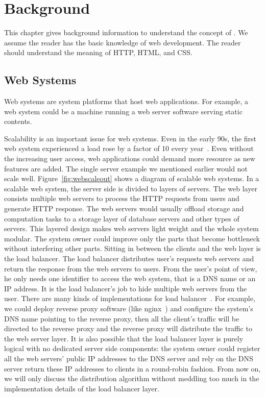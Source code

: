 \chapter{Background}

This chapter gives background information to understand the concept of \cbtwo.
We assume the reader has the basic knowledge of web development.
The reader should understand the meaning of HTTP, HTML, \js and CSS.

\webscaleoutfig{}

\section{Web Systems}

Web systems are system platforms that host web applications.
For example, a web system could be a machine running a web
server software serving static contents.

Scalability is an important issue for web systems.
Even in the early 90s, the first web system experienced a load rose by a factor
of 10 every year~\cite{berners1998world}.
Even without the increasing user access,
web applications could demand more resource as new features are added.
The single server example we mentioned earlier would not scale well.
Figure~\ref{fig:webscaleout} shows a diagram of scalable web systems.
In a scalable web system, the server side is divided to layers of servers.
The web layer consists multiple web servers to process the HTTP requests from users
and generate HTTP response.
The web servers would usually offload storage and computation tasks to a storage layer
of database servers and other types of servers.
This layered design makes web servers light weight and the whole system modular.
The system owner could improve only the parts that become bottleneck without interfering
other parts.
Sitting in between the clients and the web layer is the load balancer.
The load balancer distributes user's requests web servers
and return the response from the web servers to users.
From the user's point of view, he only needs one identifier to 
access the web system, that is a DNS name or an IP address.
It is the load balancer's job to hide multiple web servers from the user.
There are many kinds of implementations for load balancer~\cite{cardellini2002state}.
For example, we could deploy reverse proxy software (like nginx~\cite{nginx})
and configure the system's DNS name pointing to the reverse proxy,
then all the client's traffic will be directed to the reverse proxy 
and the reverse proxy will distribute the traffic to the web server layer.
It is also possible that the load balancer layer is purely logical with no
dedicated server side components:
the system owner could register all the web servers' public IP addresses to the DNS server
and rely on the DNS server return these IP addresses to clients in a round-robin 
fashion.
From now on, we will only discuss the distribution algorithm without meddling too much
in the implementation details of the load balancer layer.


